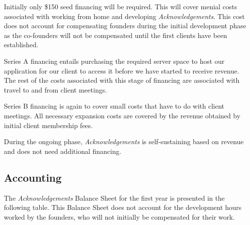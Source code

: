 Initially only \$150 seed financing will be required. This will cover menial costs associated with working from home and developing {\it Acknowledgements}. This cost does not account for compensating founders during the initial development phase as the co-founders will not be compensated until the first clients have been established.

Series A financing entails purchasing the required server space to host our application for our client to access it before we have started to receive revenue. The rest of the costs associated with this stage of financing are associated with travel to and from client meetings.

Series B financing is again to cover small costs that have to do with client meetings. All necessary expansion costs are covered by the revenue obtained by initial client membership fees.

During the ongoing phase, {\it Acknowledgements} is self-sustaining based on revenue and does not need additional financing.


\subsection{Accounting}
The {\it Acknowledgements} Balance Sheet for the first year is presented in the following table. This Balance Sheet does not account for the development hours worked by the founders, who will not initially be compensated for their work.

